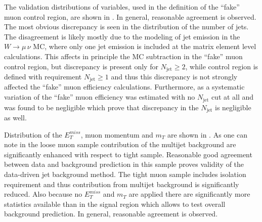The validation distributions of variables, used in the definition of the ``fake'' muon control region, are shown in .
In general, reasonable agreement is observed. The most obvious discrepancy is seen in the
distribution of the number of jets. The disagreement is likely mostly due to the modeling
of jet emission in the $W\to\mu\,\nu$ MC, where only one jet emission is included at the
matrix element level calculations.
This affects in principle the MC subtraction in the ``fake'' muon control region,
but discrepancy is present only for $N_\mathrm{jet}\geq2$, while control region is 
defined with requirement $N_\mathrm{jet}\geq1$ and thus this discrepancy is not 
strongly affected the ``fake'' muon efficiency calculations.
Furthermore, as a systematic variation of the ``fake'' muon efficiency was estimated with no $N_\mathrm{jet}$ cut at all and was found to be negligible which prove that discrepancy in
the $N_\mathrm{jet}$ is negligible as well.

Distribution of the $E_T^{miss}$, muon momentum and $m_T$ are shown in .
As one can note in the loose muon sample contribution of the multijet background are  significantly enhanced with respect to tight sample. Reasonable good agreement between data and background prediction in this sample proves validity of the data-driven jet background method.
The tight muon sample includes isolation requirement and thus contribution from multijet background is significantly reduced. Also because no $E_T^{miss}$ and $m_T$ are applied 
there are significantly more statistics available than in the signal region which allows 
to test overall background prediction. In general, reasonable agreement is observed. 


